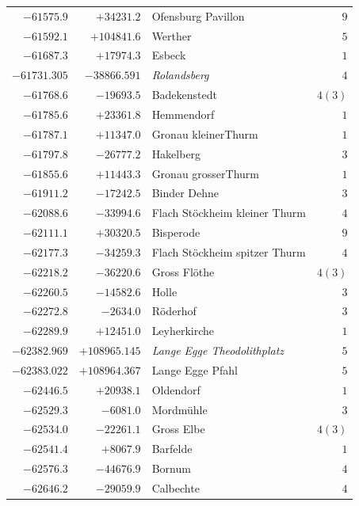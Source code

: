 \begin{center}
\begin{tabular}{r|r|p{170pt}|r}
\(-61575.9\)&\(+34231.2\)&Ofensburg Pavillon&\(9\)\\
\(-61592.1\)&\(+104841.6\)&Werther&\(5\)\\
\(-61687.3\)&\(+17974.3\)&Esbeck&\(1\)\\
\(-61731.305\)&\(-38866.591\)&\textit{Rolandsberg}&\(4\)\\
\(-61768.6\)&\(-19693.5\)&Badekenstedt&\(4 (3)\)\\
\(-61785.6\)&\(+23361.8\)&Hemmendorf&\(1\)\\
\(-61787.1\)&\(+11347.0\)&Gronau kleinerThurm&\(1\)\\
\(-61797.8\)&\(-26777.2\)&Hakelberg&\(3\)\\
\(-61855.6\)&\(+11443.3\)&Gronau grosserThurm&\(1\)\\
\(-61911.2\)&\(-17242.5\)&Binder Dehne&\(3\)\\
\(-62088.6\)&\(-33994.6\)&Flach Stöckheim kleiner Thurm&\(4\)\\
\(-62111.1\)&\(+30320.5\)&Bisperode&\(9\)\\
\(-62177.3\)&\(-34259.3\)&Flach Stöckheim spitzer Thurm&\(4\)\\
\(-62218.2\)&\(-36220.6\)&Gross Flöthe&\(4 (3)\)\\
\(-62260.5\)&\(-14582.6\)&Holle&\(3\)\\
\(-62272.8\)&\(-2634.0\)&Röderhof&\(3\)\\
\(-62289.9\)&\(+12451.0\)&Leyherkirche&\(1\)\\
\(-62382.969\)&\(+108965.145\)&\textit{Lange Egge Theodolithplatz}&\(5\)\\
\(-62383.022\)&\(+108964.367\)&Lange Egge Pfahl&\(5\)\\
\(-62446.5\)&\(+20938.1\)&Oldendorf&\(1\)\\
\(-62529.3\)&\(-6081.0\)&Mordmühle&\(3\)\\
\(-62534.0\)&\(-22261.1\)&Gross Elbe&\(4 (3)\)\\
\(-62541.4\)&\(+8067.9\)&Barfelde&\(1\)\\
\(-62576.3\)&\(-44676.9\)&Bornum&\(4\)\\
\(-62646.2\)&\(-29059.9\)&Calbechte&\(4\)\\
\hline\end{tabular}\endgroup\end{center}
